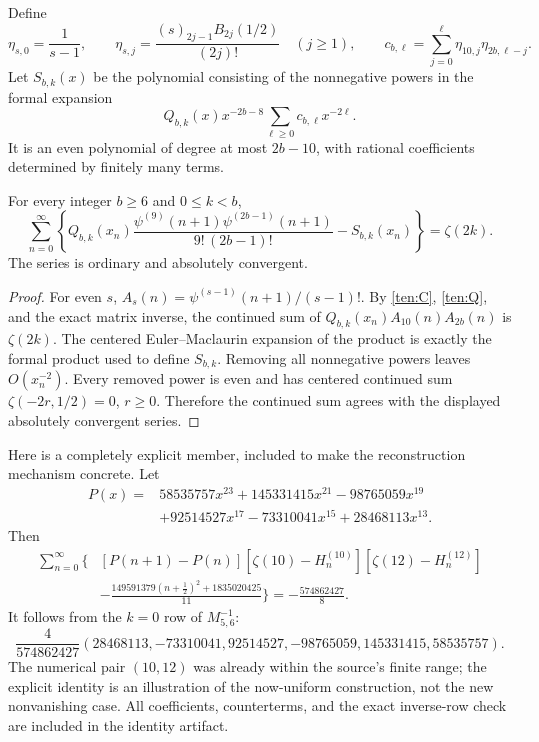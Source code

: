 Define
\[
 \eta_{s,0}=\frac1{s-1},\qquad
 \eta_{s,j}=\frac{(s)_{2j-1}B_{2j}(1/2)}{(2j)!}\quad(j\ge1),
 \qquad c_{b,\ell}=\sum_{j=0}^{\ell}\eta_{10,j}\eta_{2b,\ell-j}.
\]
Let $S_{b,k}(x)$ be the polynomial consisting of the nonnegative
powers in the formal expansion
\[
 Q_{b,k}(x)x^{-2b-8}\sum_{\ell\ge0}c_{b,\ell}x^{-2\ell}.
\]
It is an even polynomial of degree at most $2b-10$, with rational
coefficients determined by finitely many terms.

\begin{corollary}
\label{ten:identity}
For every integer $b\ge6$ and $0\le k<b$,
\begin{equation}\label{ten:polygamma}
 \boxed{\displaystyle
 \sum_{n=0}^{\infty}\left\{
 Q_{b,k}(x_n)
 \frac{\psi^{(9)}(n+1)\psi^{(2b-1)}(n+1)}{9!\,(2b-1)!}
             -S_{b,k}(x_n)\right\}=\zeta(2k).}
\end{equation}
The series is ordinary and absolutely convergent.
\end{corollary}
\begin{proof}
For even $s$, $A_s(n)=\psi^{(s-1)}(n+1)/(s-1)!$.
By \eqref{ten:C}, \eqref{ten:Q}, and the exact matrix inverse,
the continued sum of $Q_{b,k}(x_n)A_{10}(n)A_{2b}(n)$ is
$\zeta(2k)$.  The centered Euler--Maclaurin expansion of the product
is exactly the formal product used to define $S_{b,k}$.
Removing all nonnegative powers leaves $O(x_n^{-2})$.
Every removed power is even and has centered continued sum
$\zeta(-2r,1/2)=0$, $r\ge0$.  Therefore the continued sum agrees
with the displayed absolutely convergent series.
\end{proof}

Here is a completely explicit member, included to make the
reconstruction mechanism concrete.  Let
\begin{align*}
 P(x)={}&58535757x^{23}+145331415x^{21}-98765059x^{19}\\
        &+92514527x^{17}-73310041x^{15}+28468113x^{13}.
\end{align*}
Then
\begin{equation}\label{ten:explicitidentity}
 \begin{split}
 \sum_{n=0}^{\infty}\Bigg\{&
    [P(n+1)-P(n)]
        [\zeta(10)-H_n^{(10)}][\zeta(12)-H_n^{(12)}]\\
   &-\frac{149591379(n+\tfrac12)^2+1835020425}{11}
                          \Bigg\}
       =-\frac{574862427}{8}.
 \end{split}
\end{equation}
It follows from the $k=0$ row of $M_{5,6}^{-1}$:
\[
 \frac4{574862427}
 (28468113,-73310041,92514527,-98765059,145331415,58535757).
\]
The numerical pair $(10,12)$ was already within the source's finite
range; the explicit identity is an illustration of the now-uniform
construction, not the new nonvanishing case.  All coefficients,
counterterms, and the exact inverse-row check are included in the
identity artifact.

